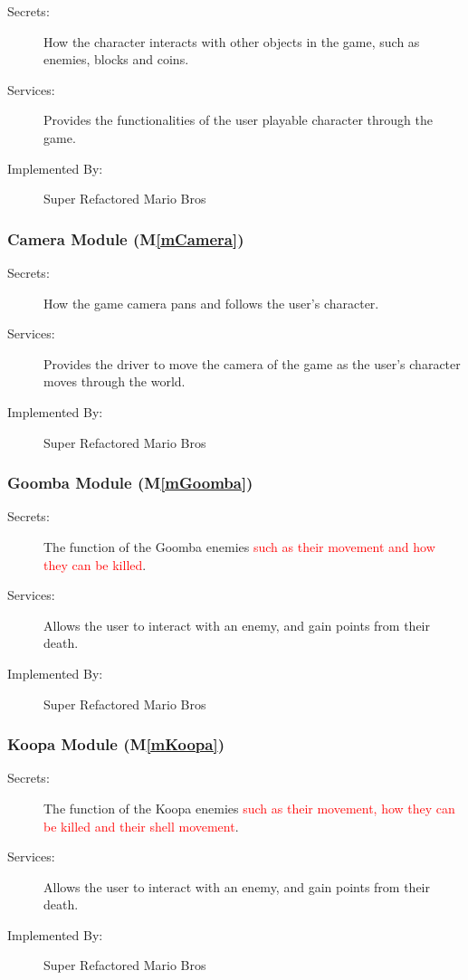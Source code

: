 \documentclass[12pt, titlepage]{article}
\newcommand{\mref}[1]{M\ref{#1}}
\begin{document}
\begin{description}
\item[Secrets:] How the character interacts with other objects in the game, such as enemies, blocks and coins.
\item[Services:] Provides the functionalities of the user playable character through the game.
\item[Implemented By:] Super Refactored Mario Bros
\end{description}

\subsubsection{Camera Module (\mref{mCamera})}

\begin{description}
\item[Secrets:] How the game camera pans and follows the user's character.
\item[Services:] Provides the driver to move the camera of the game as the user's character moves through the world.
\item[Implemented By:] Super Refactored Mario Bros
\end{description}

\subsubsection{Goomba Module (\mref{mGoomba})}

\begin{description}
\item[Secrets:] The function of the Goomba enemies \textcolor{red}{such as their movement and how they can be killed}.
\item[Services:] Allows the user to interact with an enemy, and gain points from their death.
\item[Implemented By:] Super Refactored Mario Bros
\end{description}

\subsubsection{Koopa Module (\mref{mKoopa})}

\begin{description}
\item[Secrets:] The function of the Koopa enemies \textcolor{red}{such as their movement, how they can be killed and their shell movement}.
\item[Services:] Allows the user to interact with an enemy, and gain points from their death.
\item[Implemented By:] Super Refactored Mario Bros
\end{description}
\end{document}
